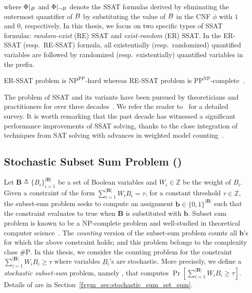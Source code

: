 where $ \Phi|_{B} $ and $ \Phi|_{\neg B} $ denote the SSAT formulas derived by eliminating the outermost quantifier of $ B $  by substituting the value of $ B $ in the CNF $ \phi $ with $ 1 $ and $ 0 $, respectively. In this thesis, we focus on two specific types of SSAT formulas:  \textit{random-exist} (RE) SSAT and \textit{exist-random} (ER) SSAT. In the ER-SSAT (resp.\ RE-SSAT) formula, all existentially (resp.\ randomized) quantified variables are followed by randomized (resp.\ existentially) quantified variables in the prefix.


\begin{remark}
	ER-SSAT problem is $\mathrm{NP}^{\mathrm{PP}}$-hard whereas RE-SSAT problem is $\mathrm{PP}^{\mathrm{NP}}$-complete~\cite{littman2001stochastic}.
\end{remark}



The problem of SSAT and its variants have been pursued by theoreticians and practitioners for over three decades~\cite{majercik2005dc,fremont2017maximum,huang2006combining}. We refer the reader to~\cite{lee2017solving,lee2018solving} for a detailed survey. It is worth remarking that the past decade has witnessed a significant performance improvements of SSAT solving, thanks to the close integration of techniques from SAT solving with advances in weighted model counting~\cite{sang2004combining,chakraborty2013scalable,chakraborty2014distribution}. 


\subsection*{Stochastic Subset Sum Problem ({\stochastic})} 
Let $ \mathbf{B} \triangleq \{B_i\}_{i=1}^{|\mathbf{B}|}$ be a set of Boolean variables and $ W_i \in \mathbb{Z} $ be the weight of $ B_i $. Given a constraint of the form  $\sum_{i = 1}^ {|\mathbf{B}|} W_i B_i = \tau $, for a constant threshold $ \tau \in \mathbb{Z} $, the subset-sum problem seeks to compute an assignment $\mathbf{b} \in \{0,1\}^{|\mathbf{B}|}$ such that the constraint evaluates to true when $\mathbf{B}$ is substituted with $\mathbf{b}$. Subset sum problem is known to be a $ \mathrm{NP} $-complete problem and well-studied in theoretical computer science~\cite{kleinberg2006algorithm}. The \textit{counting} version of the subset-sum problem counts all $ \mathbf{b} $'s for which the above constraint holds; and this problem belongs to the complexity class $ \mathrm{\#P} $. In this thesis, we consider the counting problem for the constraint $\sum_{i = 1}^ {|\mathbf{B}|} W_i B_i \ge \tau $ where variables $ B_i $'s are stochastic. More precisely, we define a \textit{stochastic subset-sum} problem, namely {\stochastic}, that computes $ \Pr[\sum_{i = 1}^ {|\mathbf{B}|} W_iB_i \ge \tau] $.    Details of {\stochastic} are in Section~\ref{fvgm_sec:stochastic_sum_set_sum}.



